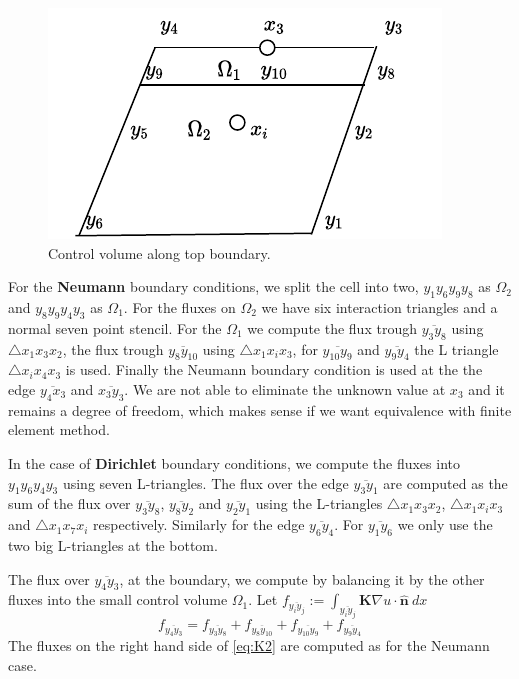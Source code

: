 \documentclass[../Main/main.tex]{subfiles}
\begin{document}
	\begin{figure}[H]\label{fig:volumepartition}
		\centering
		\includegraphics{volumepartition.pdf}
		\caption{Control volume along top boundary.}
	\end{figure}
	For the \textbf{Neumann} boundary conditions, we split the cell into two, $y_1 y_6 y_9 y_8$ as $\Omega_2$ and $y_8 y_9 y_4 y_3$ as  $\Omega_1$. For the fluxes on $\Omega_2$ we have six interaction triangles and a normal seven point stencil. For the $\Omega_1$ we compute the flux trough $\overline{y_3 y_8}$ using $\triangle x_1 x_3 x_2$, the flux trough $\overline{y_8 y_{10}}$ using $\triangle x_1 x_i x_3$, for $\overline{y_{10}y_9}$ and $\overline{y_9 y_4}$ the L triangle  $\triangle x_i x_4 x_3$ is used. Finally the Neumann boundary condition is used at the the edge $\overline{y_4 x_3}$ and $\overline{x_3 y_3}$. We are not able to eliminate the unknown value at $x_3$ and it remains a degree of freedom, which makes sense if we want equivalence with finite element method.
	\par
	In the case of \textbf{Dirichlet} boundary conditions, we compute the fluxes into $y_1 y_6 y_4 y_3$ using seven L-triangles. The flux over the edge $\overline{y_3 y_1}$ are computed as the sum of the flux over $\overline{y_3 y_8}$, $\overline{y_8 y_2}$ and $\overline{y_2 y_1}$ using the L-triangles $\triangle x_1 x_3 x_2$, $\triangle x_1 x_i x_3$ and $\triangle x_1 x_7 x_i$ respectively. Similarly for the edge $\overline{y_6 y_4}$. For $\overline{y_1 y_6}$ we only use the two big L-triangles at the bottom. 
	\par 
	The flux over $\overline{y_4 y_3}$, at the boundary, we compute by balancing it by the other fluxes into the small control volume $\Omega_1$. Let $	f_{\overline{y_i y_j}}:= \int_{\overline{y_i y_j}}  \pmb{K}\nabla u \cdot \pmb{\hat{n}}\ dx $
	\begin{equation}\label{eq:K2}
		f_{\overline{y_4 y_3}} = f_{\overline{y_3 y_8}} + f_{\overline{y_8 y_{10}}}+f_{\overline{y_{10}y_9}}+f_{\overline{y_9 y_4}}
	\end{equation}
	The fluxes on the right hand side of \eqref{eq:K2} are computed as for the Neumann case.
\end{document}
